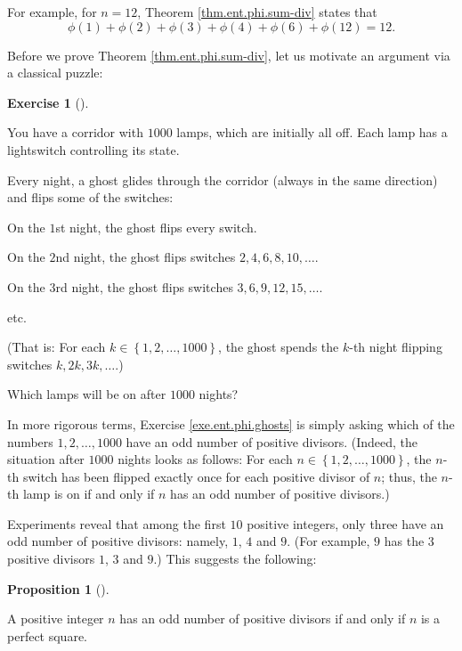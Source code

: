 \documentclass[numbers=enddot,12pt,final,onecolumn,notitlepage]{scrartcl}%
\newcounter{exer}
\numberwithin{exer}{subsection}
\theoremstyle{definition}
\newtheorem{prop}[theo]{Proposition}
\newenvironment{proposition}[1][]
{\begin{prop}[#1]\begin{leftbar}}
{\end{leftbar}\end{prop}}
\newtheorem{exmp}[exer]{Exercise}
\newenvironment{exercise}[1][]
{\begin{exmp}[#1]\begin{leftbar}}
{\end{leftbar}\end{exmp}}
\begin{document}
For example, for $n=12$, Theorem \ref{thm.ent.phi.sum-div} states that%
\[
\phi\left(  1\right)  +\phi\left(  2\right)  +\phi\left(  3\right)
+\phi\left(  4\right)  +\phi\left(  6\right)  +\phi\left(  12\right)  =12.
\]


Before we prove Theorem \ref{thm.ent.phi.sum-div}, let us motivate an argument
via a classical puzzle:

\begin{exercise}
\label{exe.ent.phi.ghosts}You have a corridor with $1000$ lamps, which are
initially all off. Each lamp has a lightswitch controlling its state.

Every night, a ghost glides through the corridor (always in the same
direction) and flips some of the switches:

On the $1$st night, the ghost flips every switch.

On the $2$nd night, the ghost flips switches $2,4,6,8,10,\ldots$.

On the $3$rd night, the ghost flips switches $3,6,9,12,15,\ldots$.

etc.

(That is: For each $k\in\left\{  1,2,\ldots,1000\right\}  $, the ghost spends
the $k$-th night flipping switches $k,2k,3k,\ldots$.)

Which lamps will be on after $1000$ nights?
\end{exercise}

In more rigorous terms, Exercise \ref{exe.ent.phi.ghosts} is simply asking
which of the numbers $1,2,\ldots,1000$ have an odd number of positive
divisors. (Indeed, the situation after $1000$ nights looks as follows: For
each $n\in\left\{  1,2,\ldots,1000\right\}  $, the $n$-th switch has been
flipped exactly once for each positive divisor of $n$; thus, the $n$-th lamp
is on if and only if $n$ has an odd number of positive divisors.)

Experiments reveal that among the first $10$ positive integers, only three
have an odd number of positive divisors: namely, $1$, $4$ and $9$. (For
example, $9$ has the $3$ positive divisors $1$, $3$ and $9$.) This suggests
the following:

\begin{proposition}
\label{prop.ent.phi.ghosts}A positive integer $n$ has an odd number of
positive divisors if and only if $n$ is a perfect square.
\end{proposition}
\end{document}
